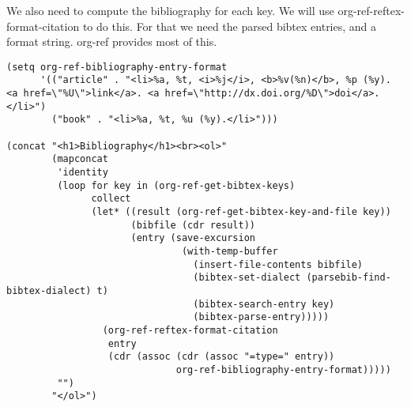 \documentclass[11pt]{article}
\begin{document}
We also need to compute the bibliography for each key. We will use org-ref-reftex-format-citation to do this. For that we need the parsed bibtex entries, and a format string. org-ref provides most of this.

\begin{verbatim}
(setq org-ref-bibliography-entry-format
      '(("article" . "<li>%a, %t, <i>%j</i>, <b>%v(%n)</b>, %p (%y). <a href=\"%U\">link</a>. <a href=\"http://dx.doi.org/%D\">doi</a>.</li>")
        ("book" . "<li>%a, %t, %u (%y).</li>")))

(concat "<h1>Bibliography</h1><br><ol>"
        (mapconcat
         'identity
         (loop for key in (org-ref-get-bibtex-keys)
               collect
               (let* ((result (org-ref-get-bibtex-key-and-file key))
                      (bibfile (cdr result))
                      (entry (save-excursion
                               (with-temp-buffer
                                 (insert-file-contents bibfile)
                                 (bibtex-set-dialect (parsebib-find-bibtex-dialect) t)
                                 (bibtex-search-entry key)
                                 (bibtex-parse-entry)))))
                 (org-ref-reftex-format-citation
                  entry
                  (cdr (assoc (cdr (assoc "=type=" entry))
                              org-ref-bibliography-entry-format)))))
         "")
        "</ol>")
\end{verbatim}
\end{document}
